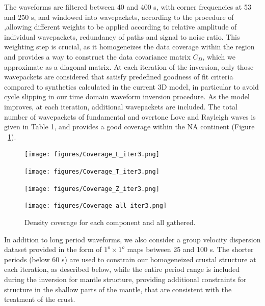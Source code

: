 \documentclass[12pt]{article}
\begin{document}
The waveforms are filtered between 40 and 400 s, with corner frequencies at 53 and 250 s, and windowed into wavepackets, according to the procedure of \cite{li1996global} ,allowing different weights to be applied according to relative amplitude of individual wavepackets, redundancy of paths and signal to noise ratio. 
This weighting step is crucial, as it homogeneizes the data coverage within the region and provides a way to construct the data covariance matrix $C_D$, which we approximate as a diagonal matrix. 
At each iteration of the inversion, only those wavepackets are considered that satisfy predefined goodness of fit criteria compared to synthetics calculated in the current 3D model, in particular to avoid cycle slipping in our time domain waveform inversion procedure. 
As the model improves, at each iteration, additional wavepackets are included. 
The total number of wavepackets of fundamental and overtone Love and Rayleigh waves is given in Table 1, and provides a good coverage within the NA continent (Figure ~\ref{density_coverage}).


\begin{figure}[p]
	\begin{minipage}{0.47\linewidth}
		\centerline{\texttt{[image: figures/Coverage\_L\_iter3.png]}}
	\end{minipage}
	\hfill
	\begin{minipage}{0.47\linewidth}
		\centerline{\texttt{[image: figures/Coverage\_T\_iter3.png]}}
	\end{minipage}

	\begin{minipage}{0.47\linewidth}
		\centerline{\texttt{[image: figures/Coverage\_Z\_iter3.png]}}
	\end{minipage}
	\hfill
	\begin{minipage}{0.47\linewidth}
		\centerline{\texttt{[image: figures/Coverage\_all\_iter3.png]}}
	\end{minipage}

\caption{Density coverage for each component and all gathered.} 
\label{density_coverage}

\end{figure}


In addition to long period waveforms, we also consider a group velocity dispersion dataset \citep{shapiro2002monte} provided in the form of $1^o \times 1^o $ maps between 25 and 100 s. 
The shorter periods (below 60 s) are used to constrain our homogeneized crustal structure at each iteration, as described below, while the entire period range is included during the inversion for mantle structure, providing additional constraints for structure in the shallow parts of the mantle, that are consistent with the treatment of the crust.
\end{document}
